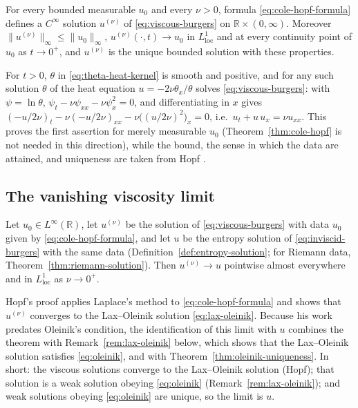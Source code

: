 \begin{corollary}
\label{cor:global-smoothness}
For every bounded measurable $u_0$ and every $\nu>0$, formula
\eqref{eq:cole-hopf-formula} defines a $C^\infty$ solution $u^{(\nu)}$ of
\eqref{eq:viscous-burgers} on $\mathbb{R}\times(0,\infty)$. Moreover
$\|u^{(\nu)}\|_\infty\le\|u_0\|_\infty$, $u^{(\nu)}(\cdot,t)\to u_0$ in
$L^1_{\mathrm{loc}}$ and at every continuity point of $u_0$ as $t\to0^+$, and
$u^{(\nu)}$ is the unique bounded solution with these properties.
\end{corollary}

\noindent For $t>0$, $\theta$ in \eqref{eq:theta-heat-kernel} is smooth and
positive, and for any such solution $\theta$ of the heat equation
$u=-2\nu\theta_x/\theta$ solves \eqref{eq:viscous-burgers}: with
$\psi=\ln\theta$, $\psi_t-\nu\psi_{xx}-\nu\psi_x^2=0$, and differentiating in
$x$ gives $(-u/2\nu)_t-\nu(-u/2\nu)_{xx}-\nu\big((u/2\nu)^2\big)_x=0$, i.e.\
$u_t+u\,u_x=\nu u_{xx}$. This proves the first assertion for merely measurable
$u_0$ (Theorem~\ref{thm:cole-hopf} is not needed in this direction), while the
bound, the sense in which the data are attained, and uniqueness are taken from
Hopf \cite{hopf1950}.

\subsection{The vanishing viscosity limit}
\label{subsec:vanishing-viscosity}

\begin{theorem}
\label{thm:vanishing-viscosity}
Let $u_0\in L^\infty(\mathbb{R})$, let $u^{(\nu)}$ be the solution of
\eqref{eq:viscous-burgers} with data $u_0$ given by
\eqref{eq:cole-hopf-formula}, and let $u$ be the entropy solution of
\eqref{eq:inviscid-burgers} with the same data
(Definition~\ref{def:entropy-solution}; for Riemann data,
Theorem~\ref{thm:riemann-solution}). Then $u^{(\nu)} \to u$ pointwise almost
everywhere and in $L^1_{\mathrm{loc}}$ as $\nu \to 0^+$.
\end{theorem}

Hopf's proof \cite{hopf1950} applies Laplace's method to
\eqref{eq:cole-hopf-formula} and shows that $u^{(\nu)}$ converges to the
Lax--Oleinik solution \eqref{eq:lax-oleinik}. Because his work predates Oleinik's
condition, the identification of this limit with $u$ combines the theorem with
Remark~\ref{rem:lax-oleinik} below, which shows that the Lax--Oleinik solution
satisfies \eqref{eq:oleinik}, and with Theorem~\ref{thm:oleinik-uniqueness}. In
short: the viscous solutions converge to the Lax--Oleinik solution (Hopf); that
solution is a weak solution obeying \eqref{eq:oleinik} (Remark~\ref{rem:lax-oleinik});
and weak solutions obeying \eqref{eq:oleinik} are unique, so the limit is $u$.

